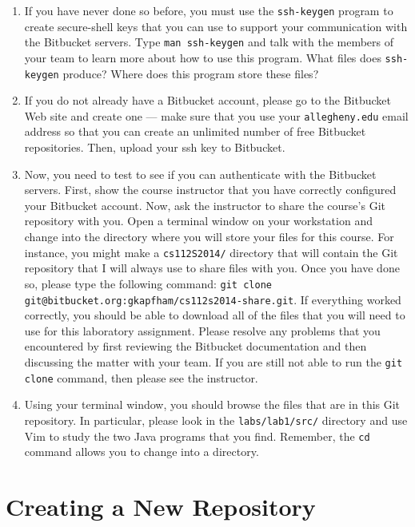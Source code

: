 \begin{enumerate}
	
  \item If you have never done so before, you must use the {\tt ssh-keygen} program to create secure-shell keys that you
    can use to support your communication with the Bitbucket servers.  Type {\tt man ssh-keygen} and talk with the
    members of your team to learn more about how to use this program.  What files does {\tt ssh-keygen} produce?  Where
    does this program store these files?

  \item If you do not already have a Bitbucket account, please go to the Bitbucket Web site and create one --- 
    make sure that you use your {\tt allegheny.edu} email address so that you can create an unlimited number of free
    Bitbucket repositories. Then, upload your ssh key to Bitbucket.

  \item Now, you need to test to see if you can authenticate with the Bitbucket servers.  First, show the course
    instructor that you have correctly configured your Bitbucket account.  Now, ask the instructor to share the course's
    Git repository with you.  Open a terminal window on your workstation and change into the directory where you will
    store your files for this course.  For instance, you might make a {\tt cs112S2014/} directory that will contain the
    Git repository that I will always use to share files with you.  Once you have done so, please type the following
    command: {\tt git clone git@bitbucket.org:gkapfham/cs112s2014-share.git}.  If everything worked correctly, you
    should be able to download all of the files that you will need to use for this laboratory assignment. Please resolve
    any problems that you encountered by first reviewing the Bitbucket documentation and then discussing the matter
    with your team. If you are still not able to run the {\tt git clone} command, then please see the instructor.

  \item Using your terminal window, you should browse the files that are in this Git repository.  In particular, please
    look in the {\tt labs/lab1/src/} directory and use Vim to study the two Java programs that you find.  Remember, the
    {\tt cd} command allows you to change into a directory. 

\end{enumerate}

\section*{Creating a New Repository}

